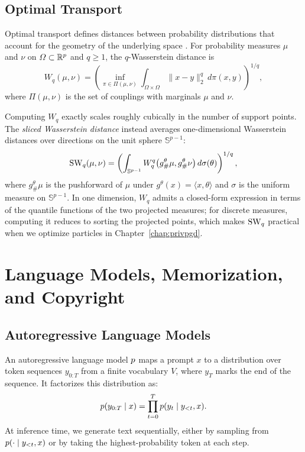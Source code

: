 \subsection{Optimal Transport}

Optimal transport defines distances between probability distributions that account for the geometry of the underlying space \citep{torres2021survey}. For probability measures \(\mu\) and \(\nu\) on \(\Omega \subset \mathbb{R}^p\) and \(q \geq 1\), the \(q\)-Wasserstein distance is
\[
  W_q(\mu, \nu)
  =
  \left(
    \inf_{\pi \in \Pi(\mu, \nu)}
    \int_{\Omega \times \Omega} \|x - y\|_2^q \, d\pi(x, y)
  \right)^{1/q},
\]
where \(\Pi(\mu, \nu)\) is the set of couplings with marginals \(\mu\) and \(\nu\).

Computing \(W_q\) exactly scales roughly cubically in the number of support points. The \emph{sliced Wasserstein distance} \citep{bonneel2015sliced,kolouri2018sliced} instead averages one-dimensional Wasserstein distances over directions on the unit sphere \(\mathbb{S}^{p-1}\):
\[
  \operatorname{SW}_q(\mu, \nu)
  =
  \left(
    \int_{\mathbb{S}^{p-1}}
    W_q^q\bigl(g^\theta_{\#}\mu, g^\theta_{\#}\nu\bigr)\, d\sigma(\theta)
  \right)^{1/q},
\]
where \(g^\theta_{\#}\mu\) is the pushforward of \(\mu\) under \(g^\theta(x) = \langle x, \theta \rangle\) and \(\sigma\) is the uniform measure on \(\mathbb{S}^{p-1}\). In one dimension, \(W_q\) admits a closed-form expression in terms of the quantile functions of the two projected measures; for discrete measures, computing it reduces to sorting the projected points, which makes \(\operatorname{SW}_q\) practical when we optimize particles in Chapter~\ref{chap:privpgd}.

\section{Language Models, Memorization, and Copyright}
\label{sec:bg-lm}

\subsection{Autoregressive Language Models}

An autoregressive language model \(p\) maps a prompt \(x\) to a distribution over token sequences \(y_{0:T}\) from a finite vocabulary \(V\), where \(y_T\) marks the end of the sequence. It factorizes this distribution as:
\[
  p(y_{0:T} \mid x) = \prod_{t=0}^{T} p(y_t \mid y_{<t}, x).
\]
At inference time, we generate text sequentially, either by sampling from \(p(\cdot \mid y_{<t}, x)\) or by taking the highest-probability token at each step.

